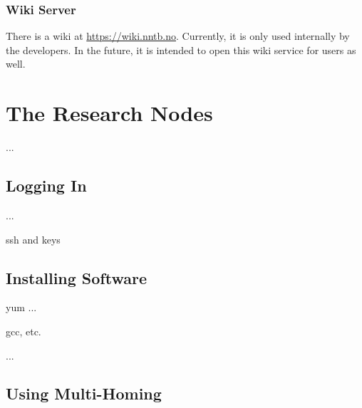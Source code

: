 \subsection{Wiki Server}

There is a  wiki at \url{https://wiki.nntb.no}. Currently, it is only used internally by the developers. In the future, it is intended to open this wiki service for  users as well.



\chapter{The Research Nodes}
\label{cha:Research-Nodes}

...

\section{Logging In}
\label{sec:Logging-In}

...

ssh and keys



\section{Installing Software}
\label{sec:Installing-Software}

yum ...

gcc, etc.

...


\section{Using Multi-Homing}
\label{sec:Using-Multi-Homing}

